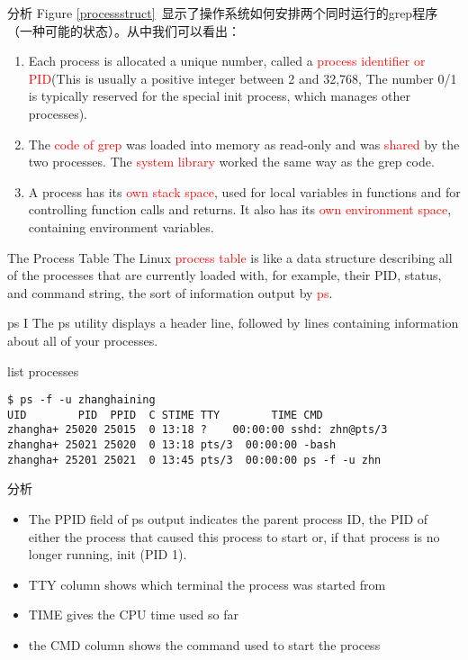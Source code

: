 \documentclass{beamer}
\begin{document}
\begin{frame}{分析}
Figure \ref{processstruct} 显示了操作系统如何安排两个同时运行的grep程序（一种可能的状态）。从中我们可以看出：
\begin{enumerate}
\item
Each process is allocated a unique number, called a \textcolor{red}{process identifier or PID}(This is usually a positive integer between 2 and 32,768, The number 0/1 is typically reserved for the special init process, which manages other processes). 
\item
The \textcolor{red}{code of grep} was loaded into memory as read-only and was \textcolor{red}{shared} by the two processes. The \textcolor{red}{system library} worked the same way as the grep code.
\item
A process has its \textcolor{red}{own stack space}, used for local variables in functions and for controlling function calls and returns. It also has its \textcolor{red}{own environment space}, containing environment variables.
\end{enumerate}
\end{frame}
\begin{frame}{The Process Table}
The Linux \textcolor{red}{process table} is like a data structure describing all of the processes that are currently loaded with, for example, their PID, status, and command string, the sort of information output by \textcolor{red}{ps}. 
\end{frame}
\begin{frame}[fragile]{ps I}
\label{proclist}
The ps utility displays a header line, followed by lines containing information about all of your processes.
\begin{block}{list processes}
\begin{verbatim}
$ ps -f -u zhanghaining
UID        PID  PPID  C STIME TTY        TIME CMD
zhangha+ 25020 25015  0 13:18 ?    00:00:00 sshd: zhn@pts/3
zhangha+ 25021 25020  0 13:18 pts/3  00:00:00 -bash
zhangha+ 25201 25021  0 13:45 pts/3  00:00:00 ps -f -u zhn
\end{verbatim}
\end{block}
\end{frame}
\begin{frame}{分析}
\begin{itemize}
\item
The PPID field of ps output indicates the parent process ID, the PID of either the process that caused this
process to start or, if that process is no longer running, init (PID 1).
\item
TTY column shows which terminal the process was started from
\item
TIME gives the CPU time used so far
\item
the CMD column shows the command used to start the process
\end{itemize}
\end{frame}
\end{document}
